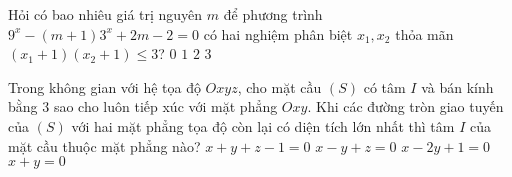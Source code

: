 \begin{ex}%
Hỏi có bao nhiêu giá trị nguyên $ m $ để phương trình $ 9^x - (m+1)3^x + 2m - 2 = 0 $ có hai nghiệm phân biệt $ x_1, x_2 $ thỏa mãn $ (x_1 + 1)( x_2 + 1 ) \leq 3 $?	
	\choice
	{$ 0 $}
	{\True $ 1 $}
	{$ 2 $}
	{$ 3 $}
\end{ex}	
\begin{ex}%
Trong không gian với hệ tọa độ $ Oxyz $, cho mặt cầu $ (S) $ có tâm $ I $ và bán kính bằng $ 3 $ sao cho luôn tiếp xúc với mặt phẳng $ Oxy $. Khi các đường tròn giao tuyến của $ (S) $ với hai mặt phẳng tọa độ còn lại có diện tích lớn nhất thì tâm $ I $ của mặt cầu thuộc mặt phẳng nào?	
	\choice
	{$ x + y + z - 1 = 0 $}
	{$ x - y + z = 0 $}
	{$ x - 2y + 1 = 0 $}
	{\True $ x + y = 0 $}
\end{ex}	
